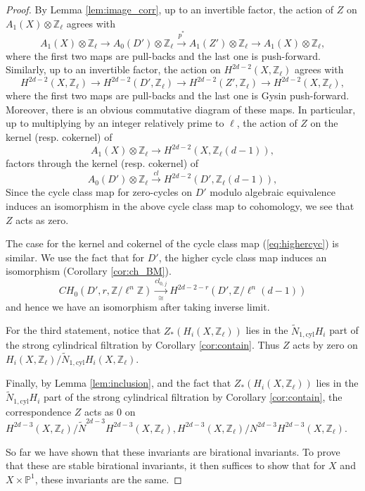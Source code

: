 \documentclass{amsart}
\theoremstyle{definition}
\theoremstyle{remark}
\newcommand{\mbb}{\mathbb}
\newcommand{\ZZ}{\mbb{Z}}
\newcommand{\PP}{\mbb{P}}
\newcommand{\cyl}{\text{cyl}}
\begin{document}
\begin{proof}
    By Lemma \ref{lem:image_corr}, up to an invertible factor, the action of $Z$ on $A_1(X) \otimes \ZZ_\ell$  agrees with
    \[
    A_1(X)\otimes \ZZ_\ell \to A_0(D')\otimes \ZZ_\ell \xrightarrow{p^*} A_1(Z')\otimes \ZZ_\ell \to A_1(X)\otimes \ZZ_\ell,
    \]
    where the first two maps are pull-backs and the last one is push-forward.
    Similarly, up to an invertible factor, the action on $H^{2d-2}(X, \ZZ_\ell)$ agrees with
    \[
    H^{2d-2}(X, \ZZ_\ell)\to H^{2d-2}(D', \ZZ_\ell) \to H^{2d-2}(Z', \ZZ_\ell) \to H^{2d-2}(X, \ZZ_\ell),
    \]
    where the first two maps are pull-backs and the last one is Gysin push-forward.
    Moreover, there is an obvious commutative diagram of these maps.
    In particular, up to multiplying by an integer relatively prime to $\ell$, the action of $Z$ on the kernel (resp. cokernel) of 
    \[
    A_1(X)\otimes \ZZ_\ell \to H^{2d-2}(X, \ZZ_\ell(d-1)),
    \] 
    factors through the kernel (resp. cokernel) of 
    \[
    A_0(D')\otimes \ZZ_\ell \xrightarrow{cl} H^{2d-2}(D', \ZZ_\ell(d-1)),
    \]
    Since the cycle class map for zero-cycles on $D'$ modulo algebraic equivalence induces 
 an isomorphism in the above cycle class map to cohomology, we see that $Z$ acts as zero.

    The case for the kernel and cokernel of the cycle class map (\ref{eq:highercyc}) is similar. We use the fact that for $D'$, the higher cycle class map induces an isomorphism (Corollary \ref{cor:ch_BM}).
    \[
    CH_0(D', r, \ZZ/\ell^n\ZZ) \xrightarrow[\cong]{cl_{0, j}} H^{2d-2-r}(D', \ZZ/{\ell^n}(d-1))
    \]
    and hence we have an isomorphism after taking inverse limit.

    For the third statement, notice  that $Z_*(H_i(X, \ZZ_\ell))$
    lies in the $\tilde{N}_{1, \cyl}H_i$ part of the strong cylindrical filtration by Corollary \ref{cor:contain}. Thus $Z$ acts by zero on $H_i(X, \ZZ_\ell)/\tilde{N}_{1, \cyl}H_i(X, \ZZ_\ell)$.
    
    Finally, by Lemma \ref{lem:inclusion}, and the fact that $Z_*(H_i(X, \ZZ_\ell))$
    lies in the $\tilde{N}_{1, \cyl}H_i$ part of the strong cylindrical filtration by Corollary \ref{cor:contain}, the correspondence $Z$ acts as $0$ on $H^{2d-3}(X, \ZZ_\ell)/\tilde{N}^{2d-3}H^{2d-3}(X, \ZZ_\ell), H^{2d-3}(X, \ZZ_\ell)/{N}^{2d-3}H^{2d-3}(X, \ZZ_\ell)$.

    So far we have shown that these invariants are birational invariants.
    To prove that these are stable birational invariants, it then suffices to show that for $X$ and $X \times \PP^1$, these invariants are the same. 


\end{proof}
\end{document}
